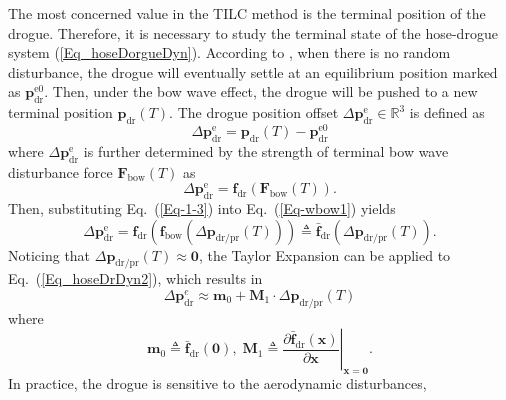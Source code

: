 The most concerned value in the TILC method is the terminal position
of the drogue. Therefore, it is necessary to study the terminal state
of the hose-drogue system (\ref{Eq_hoseDorgueDyn}). According to
\cite{wei2016drogue}, when there is no random disturbance, the drogue
will eventually settle at an equilibrium position marked as ${\mathbf{p}}_{\text{dr}}^{\text{e0}}$.
Then, under the bow wave effect, the drogue will be pushed to a new
terminal position ${\mathbf{p}}_{\text{dr}}\left(T\right)$. The drogue
position offset $\Delta{\mathbf{p}}_{\text{dr}}^{\text{e}}\in%
\mathbb{R}%
^{3}$ is defined as 
\begin{equation}
\Delta{\mathbf{p}}_{\text{dr}}^{\text{e}}={\mathbf{p}}_{\text{dr}}\left(T\right)-{\mathbf{p}}_{\text{dr}}^{\text{e0}}\label{Eq-wbow0}
\end{equation}
where $\Delta{\mathbf{p}}_{\text{dr}}^{\text{e}}$ is further determined
by the strength of terminal bow wave disturbance force {$\mathbf{F}$}$_{\text{bow}}\left(T\right)$
as
\begin{equation}
\Delta{\mathbf{p}}_{\text{dr}}^{\text{e}}={\mathbf{f}_{\text{dr}}}\left({\mathbf{F}}_{\text{bow}}\left(T\right)\right).\label{Eq-wbow1}
\end{equation}
Then, substituting Eq.~(\ref{Eq-1-3}) into Eq.~(\ref{Eq-wbow1})
yields
\begin{equation}
\Delta{\mathbf{p}}_{\text{dr}}^{\text{e}}={\mathbf{f}_{\text{dr}}}\left({\mathbf{f}}_{\text{bow}}\left(\Delta{\mathbf{p}}_{\text{dr/pr}}\left(T\right)\right)\right)\triangleq{\mathbf{\bar{f}}}_{\text{dr}}\left(\Delta{\mathbf{p}}_{\text{dr/pr}}\left(T\right)\right).\label{Eq_hoseDrDyn2}
\end{equation}
Noticing that $\Delta{\mathbf{p}}_{\text{dr/pr}}\left(T\right)\approx\mathbf{0}$,
the Taylor Expansion can be applied to Eq.~(\ref{Eq_hoseDrDyn2}),
which results in 
\begin{equation}
\Delta{\mathbf{p}}_{\text{dr}}^{e}\approx\mathbf{m}_{0}+\mathbf{M}_{1}\cdot\Delta{\mathbf{p}}_{\text{dr/pr}}\left(T\right)\label{Eq_hoseDrDyn2-1}
\end{equation}
where
\begin{equation}
\mathbf{m}_{0}\triangleq{\mathbf{\bar{f}}}_{\text{dr}}\left(\mathbf{0}\right),\;\mathbf{M}_{1}\triangleq\left.\frac{\partial{\mathbf{\bar{f}}}_{\text{dr}}\left(\mathbf{x}\right)}{\partial\mathbf{x}}\right\vert _{\mathbf{x=0}}.\label{Eq_hoseDrDyn2-2}
\end{equation}
In practice, the drogue is sensitive to the aerodynamic disturbances,
